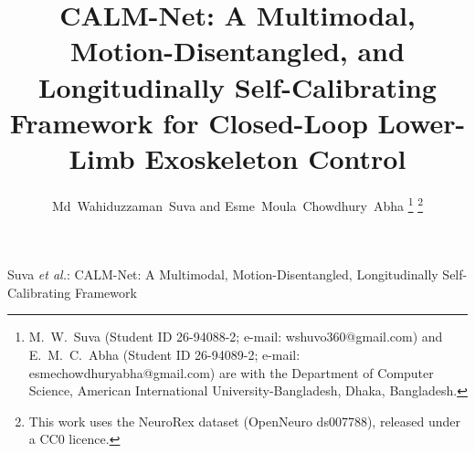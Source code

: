 \documentclass[journal]{IEEEtran}
\begin{document}
\title{CALM-Net: A Multimodal, Motion-Disentangled, and Longitudinally
Self-Calibrating Framework for Closed-Loop Lower-Limb Exoskeleton Control}

\author{Md~Wahiduzzaman~Suva and Esme~Moula~Chowdhury~Abha
\thanks{M.~W.~Suva (Student ID 26-94088-2; e-mail: \mbox{wshuvo360@gmail.com}) and
E.~M.~C.~Abha (Student ID 26-94089-2; e-mail: \mbox{esmechowdhuryabha@gmail.com}) are
with the Department of Computer Science, American International University-Bangladesh,
Dhaka, Bangladesh.}
\thanks{This work uses the NeuroRex dataset (OpenNeuro ds007788), released under
a CC0 licence.}}

%
{Suva \MakeLowercase{\textit{et al.}}: CALM-Net: A Multimodal, Motion-Disentangled, Longitudinally Self-Calibrating Framework}
\maketitle
\end{document}
